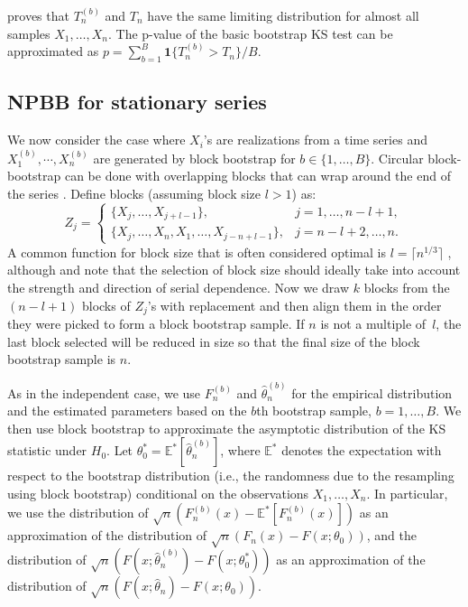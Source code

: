 \documentclass[12pt]{article}
\begin{document}
\citet{babu2004goodness} proves that $T^{(b)}_n$ and $T_n$ have the same
limiting distribution for almost all samples $X_1, \ldots, X_n$.
The p-value of the basic bootstrap KS test can be approximated
as $p = \sum_{b=1}^B \mathbf{1}\{T^{(b)}_n > T_n\} / B$.


\subsection{NPBB for stationary series}
\label{sub:npbb}

We now consider the case where $X_i$'s are realizations from a time series and
$X^{(b)}_1, \cdots ,X^{(b)}_n$ are generated by block bootstrap for
$b \in \{1, \ldots, B\}$.
Circular block-bootstrap can be done with overlapping blocks that can
wrap around the end of the series \citep{romano1992circular}.
Define blocks (assuming block size $l > 1$) as:
\begin{equation*}
Z_j =
    \begin{cases}
        \{X_j, \ldots, X_{j + l - 1}\}, & j = 1, \dots, n - l + 1,\\
        \{X_j, \ldots, X_n, X_1, \ldots, X_{j-n+l-1}\}, & j = n - l
        + 2 ,\dots, n.
    \end{cases}
\end{equation*}
A common
function for block size that is often considered optimal is
$l = \lceil n^{1/3} \rceil$ \citep{buhlmann1999block},
although \citet{hall1995blocking} and \citet{politis2004automatic} note that
the selection of block size should ideally take into account the strength
and direction of serial dependence. 
Now we draw $k$ blocks from the $(n - l + 1)$ blocks
of $Z_j$'s with replacement and then align them in the order they were picked to
form a block bootstrap sample. If $n$ is not a multiple of~$l$, the last block
selected will be reduced in size so that the final size of the block bootstrap
sample is $n$.


As in the independent case,
we use $F^{(b)}_n$ and $\hat\theta^{(b)}_n$ for the empirical distribution and
the estimated parameters based on the $b$th bootstrap sample,
$b = 1, \ldots, B$.
We then use block bootstrap to approximate the asymptotic distribution of
the KS statistic under $H_0$. Let
$\theta_0^* = \mathbb{E}^{*}[\hat\theta^{(b)}_n]$, where
$\mathbb{E}^{*}$ denotes the expectation with respect to the
bootstrap distribution (i.e., the randomness due
to the resampling using block bootstrap) conditional on the observations
$X_1, \dots, X_n$. In particular, we
use the distribution of $\sqrt{n}(F^{(b)}_n(x) - \mathbb{E}^{*}[F^{(b)}_n(x)])$
as an approximation of the distribution of
$\sqrt{n}(F_n(x) - F(x; \theta_0))$, and the distribution of
$\sqrt{n}(F(x; \hat\theta^{(b)}_n) - F(x; \theta_0^*))$ as
an approximation of the distribution of
$\sqrt{n}(F(x; \hat\theta_n) - F(x; \theta_0))$.
\end{document}
